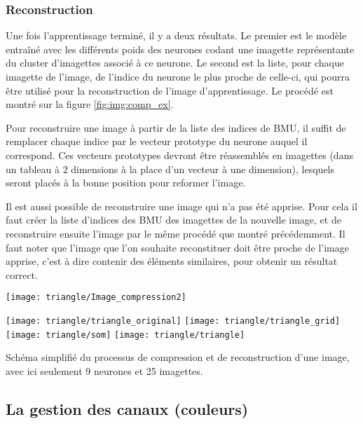 	\subsubsection{Reconstruction}

	Une fois l'apprentissage terminé, il y a deux résultats. Le premier est le modèle entraîné avec les différents poids des neurones codant une imagette représentante du cluster d'imagettes associé à ce neurone. Le second est la liste, pour chaque imagette de l'image, de l'indice du neurone le plus proche de celle-ci, qui pourra être utilisé pour la reconstruction de l'image d'apprentissage. Le procédé est montré sur la figure \ref{fig:img:comp_ex}.

	Pour reconstruire une image à partir de la liste des indices de BMU, il suffit de remplacer chaque indice par le vecteur prototype du neurone auquel il correspond. Ces vecteurs prototypes devront être réassemblés en imagettes (dans un tableau à 2 dimensions à la place d'un vecteur à une dimension), lesquels seront placés à la bonne position pour reformer l'image.

	Il est aussi possible de reconstruire une image qui n'a pas été apprise. Pour cela il faut créer la liste d'indices des BMU des imagettes de la nouvelle image, et de reconstruire ensuite l'image par le même procédé que montré précédemment. Il faut noter que l'image que l'on souhaite reconstituer doit être proche de l'image apprise, c'est à dire contenir des éléments similaires, pour obtenir un résultat correct.

	\begin{figureth}
		\begin{subfigureth}{\textwidth}
			\texttt{[image: triangle/Image\_compression2]}
		\end{subfigureth}
		\begin{subfigureth}{\textwidth}
			\texttt{[image: triangle/triangle\_original]}\hfill
			\texttt{[image: triangle/triangle\_grid]}\hfill
			\texttt{[image: triangle/som]}\hfill
			\texttt{[image: triangle/triangle]}
		\end{subfigureth}
		\caption[Compression et décompression d'image]{Schéma simplifié du processus de compression et de reconstruction d'une image, avec ici seulement 9 neurones et 25 imagettes.}\label{fig:img:comp_ex}
	\end{figureth}

	\subsection{La gestion des canaux (couleurs)}\label{sec:img:colors}

